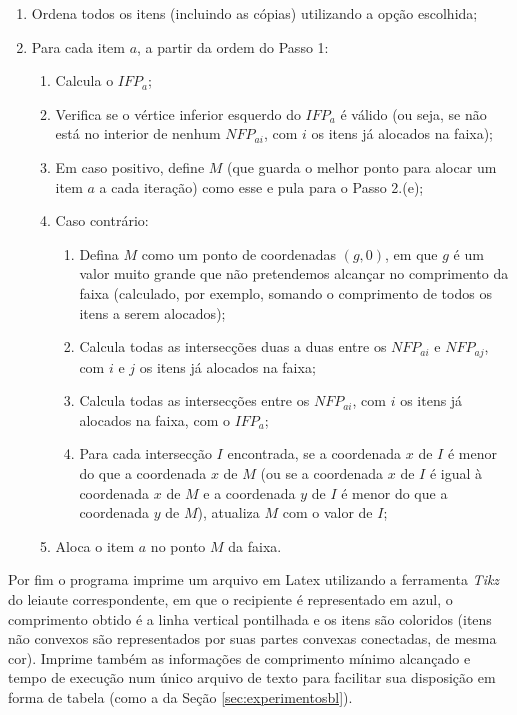 \begin{enumerate}
    \item Ordena todos os itens (incluindo as cópias) utilizando a opção escolhida;
    \item Para cada item $a$, a partir da ordem do Passo 1:
    \begin{enumerate}
        \item Calcula o $IFP_a$;
        \item Verifica se o vértice inferior esquerdo do $IFP_a$ é válido (ou seja, se não está no interior de nenhum $NFP_{ai}$, com $i$ os itens já alocados na faixa);
        \item Em caso positivo, define $M$ (que guarda o melhor ponto para alocar um item $a$ a cada iteração) como esse e pula para o Passo 2.(e);
        \item Caso contrário:
        \begin{enumerate}
            \item Defina $M$ como um ponto de coordenadas $(g,0)$, em que $g$ é um valor muito grande que não pretendemos alcançar no comprimento da faixa (calculado, por exemplo, somando o comprimento de todos os itens a serem alocados);
            \item Calcula todas as intersecções duas a duas entre os $NFP_{ai}$ e $NFP_{aj}$, com $i$ e $j$ os itens já alocados na faixa;
            \item Calcula todas as intersecções entre os $NFP_{ai}$, com $i$ os itens já alocados na faixa, com o $IFP_a$;
            \item Para cada intersecção $I$ encontrada, se a coordenada $x$ de $I$ é menor do que a coordenada $x$ de $M$ (ou se a coordenada $x$ de $I$ é igual à coordenada $x$ de $M$ e a coordenada $y$ de $I$ é menor do que a coordenada $y$ de $M$), atualiza $M$ com o valor de $I$;
        \end{enumerate}
        \item Aloca o item $a$ no ponto $M$ da faixa.
    \end{enumerate}
\end{enumerate}


Por fim o programa imprime um arquivo em Latex utilizando a ferramenta \textit{Tikz} do leiaute correspondente, em que o recipiente é representado em azul, o comprimento obtido é a linha vertical pontilhada e os itens são coloridos (itens não convexos são representados por suas partes convexas conectadas, de mesma cor). 
Imprime também as informações de comprimento mínimo alcançado e tempo de execução num único arquivo de texto para facilitar sua disposição em forma de tabela (como a da Seção \ref{sec:experimentosbl}).


